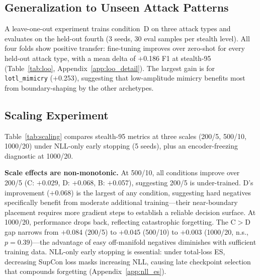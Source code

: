 \label{sec:experiments:constraints}

\subsection{Generalization to Unseen Attack Patterns}
\label{sec:experiments:loo}

A leave-one-out experiment trains condition~D on three attack types and
evaluates on the held-out fourth (3 seeds, 30 eval samples per stealth level).
All four folds show positive transfer: fine-tuning improves over zero-shot
for every held-out attack type, with a mean delta of $+$0.186 F1 at stealth-95
(Table~\ref{tab:loo}, Appendix~\ref{app:loo_detail}).
The largest gain is for \texttt{lotl\_mimicry} ($+$0.253), suggesting
that low-amplitude mimicry benefits most from boundary-shaping by
the other archetypes.

\subsection{Scaling Experiment}
\label{sec:experiments:scaling}

Table~\ref{tab:scaling} compares stealth-95 metrics at three scales
(200/5, 500/10, 1000/20) under NLL-only early stopping (5 seeds),
plus an encoder-freezing diagnostic at 1000/20.



\textbf{Scale effects are non-monotonic.}
At 500/10, all conditions improve over 200/5
(C: $+$0.029, D: $+$0.068, B: $+$0.057),
suggesting 200/5 is under-trained.
D's improvement ($+$0.068) is the largest of any condition, suggesting
hard negatives specifically benefit from moderate additional training---their
near-boundary placement requires more gradient steps to establish a reliable
decision surface.
At 1000/20, performance drops back, reflecting catastrophic forgetting.
The C$>$D gap narrows from $+$0.084 (200/5) to $+$0.045 (500/10) to
$+$0.003 (1000/20, n.s., $p{=}0.39$)---the advantage of easy off-manifold negatives diminishes with sufficient training data.
NLL-only early stopping is essential: under total-loss ES, decreasing SupCon loss masks increasing NLL, causing late checkpoint selection that compounds forgetting (Appendix~\ref{app:nll_es}).

